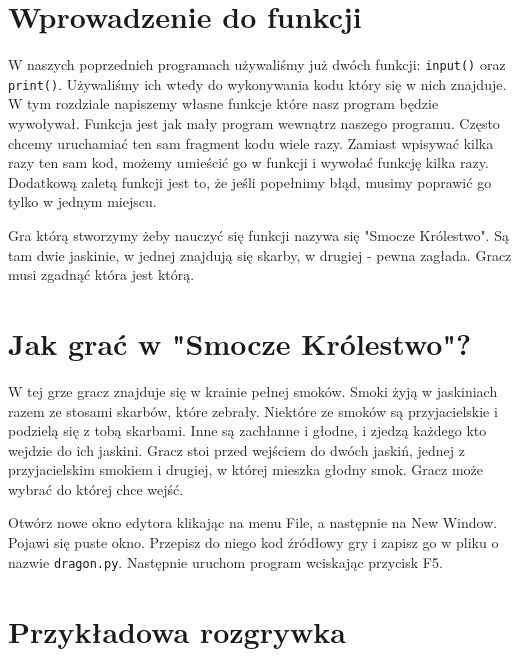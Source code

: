 \documentclass{book}
\begin{document}
\section{Wprowadzenie do funkcji}

W naszych poprzednich programach używaliśmy już dwóch funkcji: \lstinline{input()} oraz \lstinline{print()}. Używaliśmy ich wtedy do wykonywania kodu który się w nich znajduje. W tym rozdziale napiszemy własne funkcje które nasz program będzie wywoływał. Funkcja jest jak mały program wewnątrz naszego programu. Często chcemy uruchamiać ten sam fragment kodu wiele razy. Zamiast wpisywać kilka razy ten sam kod, możemy umieścić go w funkcji i wywołać funkcję kilka razy. Dodatkową zaletą funkcji jest to, że jeśli popełnimy błąd, musimy poprawić go tylko w jednym miejscu. 

Gra którą stworzymy żeby nauczyć się funkcji nazywa się "Smocze Królestwo". Są tam dwie jaskinie, w jednej znajdują się skarby, w drugiej - pewna zagłada. Gracz musi zgadnąć która jest którą.

\section{Jak grać w "Smocze Królestwo"?}

W tej grze gracz znajduje się w krainie pełnej smoków. Smoki żyją w jaskiniach razem ze stosami skarbów, które zebrały. Niektóre ze smoków są przyjacielskie i podzielą się z tobą skarbami. Inne są zachłanne i głodne, i zjedzą każdego kto wejdzie do ich jaskini. Gracz stoi przed wejściem do dwóch jaskiń, jednej z przyjacielskim smokiem i drugiej, w której mieszka głodny smok. Gracz może wybrać do której chce wejść.

Otwórz nowe okno edytora klikając na menu File, a następnie na New Window. Pojawi się puste okno. Przepisz do niego kod źródłowy gry i zapisz go w pliku o nazwie \lstinline{dragon.py}. Następnie uruchom program wciskając przycisk F5.

\section{Przykładowa rozgrywka}
\end{document}
